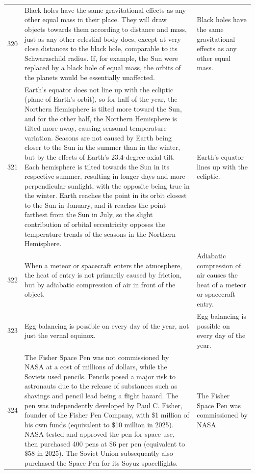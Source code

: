 \begin{tabular}{c|p{}|p{}}
320 & Black holes have the same gravitational effects as any other equal mass in their place. They will draw objects towards them according to distance and mass, just as any other celestial body does, except at very close distances to the black hole, comparable to its Schwarzschild radius. If, for example, the Sun were replaced by a black hole of equal mass, the orbits of the planets would be essentially unaffected. & Black holes have the same gravitational effects as any other equal mass. \\
321 & Earth's equator does not line up with the ecliptic (plane of Earth's orbit), so for half of the year, the Northern Hemisphere is tilted more toward the Sun, and for the other half, the Northern Hemisphere is tilted more away, causing seasonal temperature variation. Seasons are not caused by Earth being closer to the Sun in the summer than in the winter, but by the effects of Earth's 23.4-degree axial tilt. Each hemisphere is tilted towards the Sun in its respective summer, resulting in longer days and more perpendicular sunlight, with the opposite being true in the winter. Earth reaches the point in its orbit closest to the Sun in January, and it reaches the point farthest from the Sun in July, so the slight contribution of orbital eccentricity opposes the temperature trends of the seasons in the Northern Hemisphere. & Earth's equator lines up with the ecliptic. \\
322 & When a meteor or spacecraft enters the atmosphere, the heat of entry is not primarily caused by friction, but by adiabatic compression of air in front of the object. & Adiabatic compression of air causes the heat of a meteor or spacecraft entry. \\
323 & Egg balancing is possible on every day of the year, not just the vernal equinox. & Egg balancing is possible on every day of the year. \\
324 & The Fisher Space Pen was not commissioned by NASA at a cost of millions of dollars, while the Soviets used pencils. Pencils posed a major risk to astronauts due to the release of substances such as shavings and pencil lead being a flight hazard. The pen was independently developed by Paul C. Fisher, founder of the Fisher Pen Company, with \$1 million of his own funds (equivalent to \$10 million in 2025). NASA tested and approved the pen for space use, then purchased 400 pens at \$6 per pen (equivalent to \$58 in 2025). The Soviet Union subsequently also purchased the Space Pen for its Soyuz spaceflights. & The Fisher Space Pen was commissioned by NASA. \\

\end{tabular}
